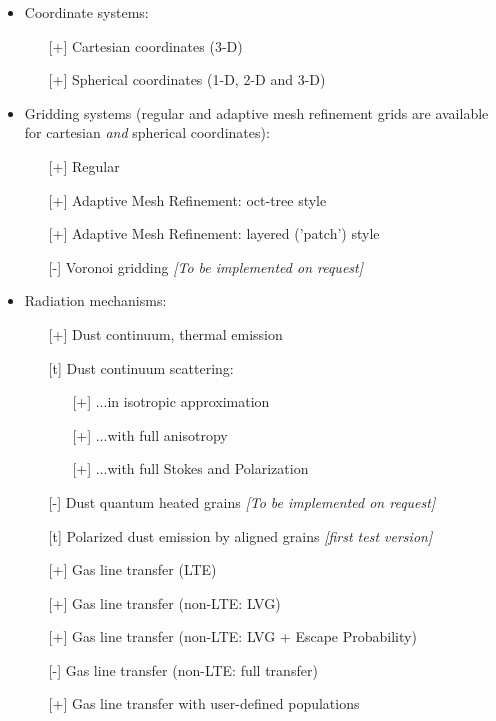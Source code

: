 \documentclass{report}
\begin{document}
\begin{itemize}
\item Coordinate systems:
  \begin{itemize}
    \item[][+] Cartesian coordinates (3-D)
    \item[][+] Spherical coordinates (1-D, 2-D and 3-D)
  \end{itemize}
\item Gridding systems (regular and adaptive mesh refinement grids are
  available for cartesian {\em and} spherical coordinates):
  \begin{itemize}
    \item[][+] Regular
    \item[][+] Adaptive Mesh Refinement: oct-tree style
    \item[][+] Adaptive Mesh Refinement: layered ('patch') style
    \item[][-] Voronoi gridding {\em [To be implemented on request]}
  \end{itemize}
\item Radiation mechanisms:
  \begin{itemize}
    \item[][+] Dust continuum, thermal emission
    \item[][t] Dust continuum scattering:
      \begin{itemize}
      \item[][+] ...in isotropic approximation
      \item[][+] ...with full anisotropy
      \item[][+] ...with full Stokes and Polarization
      \end{itemize}
    \item[][-] Dust quantum heated grains {\em [To be implemented on request]}
    \item[][t] Polarized dust emission by aligned grains {\em [first test version]}
    \item[][+] Gas line transfer (LTE)
    \item[][+] Gas line transfer (non-LTE: LVG)
    \item[][+] Gas line transfer (non-LTE: LVG + Escape Probability)
    \item[][-] Gas line transfer (non-LTE: full transfer)
    \item[][+] Gas line transfer with user-defined populations

\end{itemize}
\end{itemize}
\end{document}
